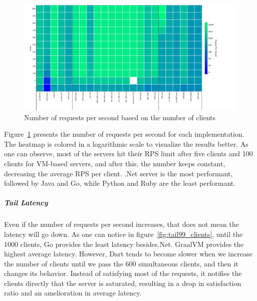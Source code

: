 \begin{figure}[!hbt]
    \begin{center}
        \includegraphics[width=1.2\linewidth]{imgs/rps_clients}
    \end{center}
    \caption{Number of requests per second based on the number of clients}\label{fig:rps_clients}
\end{figure}

Figure~\ref{fig:rps_clients} presents the number of requests per second for each implementation. The heatmap is colored in a logarithmic scale to visualize the results better.
As one can observe, most of the servers hit their RPS limit after five clients and 100 clients for VM-based servers, and after this, the number keeps constant, decreasing the average RPS per client.
.Net server is the most performant, followed by Java and Go, while Python and Ruby are the least performant.

\subparagraph{Tail Latency}
Even if the number of requests per second increases, that does not mean the latency will go down.
As one can notice in figure~\ref{fig:tail99_clients}, until the 1000 clients, Go provides the least latency besides.Net.
GraalVM provides the highest average latency.
However, Dart tends to become slower when we increase the number of clients until we pass the 600 simultaneous clients, and then it changes its behavior. Instead of satisfying most of the requests, it notifies the clients directly that the server is saturated, resulting in a drop in satisfaction ratio and an amelioration in average latency.

